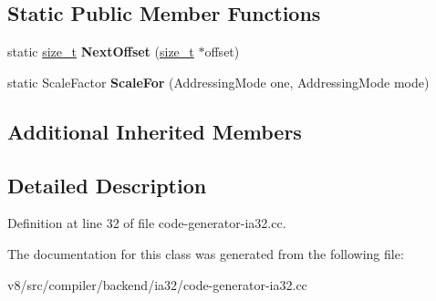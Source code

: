 \subsection*{Static Public Member Functions}
\begin{DoxyCompactItemize}
\item 
\mbox{\label{classv8_1_1internal_1_1compiler_1_1IA32OperandConverter_a4a3e27e14acefc12bdcf1671afcc5756}} 
static \mbox{\hyperlink{classsize__t}{size\+\_\+t}} {\bfseries Next\+Offset} (\mbox{\hyperlink{classsize__t}{size\+\_\+t}} $\ast$offset)
\item 
\mbox{\label{classv8_1_1internal_1_1compiler_1_1IA32OperandConverter_a4ab3618ff495426c0745d64429e21f16}} 
static Scale\+Factor {\bfseries Scale\+For} (Addressing\+Mode one, Addressing\+Mode mode)
\end{DoxyCompactItemize}
\subsection*{Additional Inherited Members}


\subsection{Detailed Description}


Definition at line 32 of file code-\/generator-\/ia32.\+cc.



The documentation for this class was generated from the following file\+:\begin{DoxyCompactItemize}
\item 
v8/src/compiler/backend/ia32/code-\/generator-\/ia32.\+cc\end{DoxyCompactItemize}
